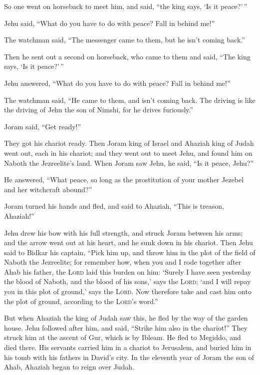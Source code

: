  So one went on horseback to meet him, and said, ``the
king says, `Is it peace?'\,''

Jehu said, ``What do you have to do with peace? Fall in behind me!''

The watchman said, ``The messenger came to them, but he isn't coming
back.''

 Then he sent out a second on horseback, who came to them
and said, ``The king says, `Is it peace?'\,''

Jehu answered, ``What do you have to do with peace? Fall in behind me!''

 The watchman said, ``He came to them, and isn't coming
back. The driving is like the driving of Jehu the son of Nimshi, for he
drives furiously.''

 Joram said, ``Get ready!''

They got his chariot ready. Then Joram king of Israel and Ahaziah king
of Judah went out, each in his chariot; and they went out to meet Jehu,
and found him on Naboth the Jezreelite's land.  When
Joram saw Jehu, he said, ``Is it peace, Jehu?''

He answered, ``What peace, so long as the prostitution of your mother
Jezebel and her witchcraft abound?''

 Joram turned his hands and fled, and said to Ahaziah,
``This is treason, Ahaziah!''

 Jehu drew his bow with his full strength, and struck
Joram between his arms; and the arrow went out at his heart, and he sunk
down in his chariot.  Then Jehu said to Bidkar his
captain, ``Pick him up, and throw him in the plot of the field of Naboth
the Jezreelite; for remember how, when you and I rode together after
Ahab his father, the \textsc{Lord} laid this burden on him:
 `Surely I have seen yesterday the blood of Naboth, and
the blood of his sons,' says the \textsc{Lord}; `and I will repay you in
this plot of ground,' says the \textsc{Lord}. Now therefore take and
cast him onto the plot of ground, according to the \textsc{Lord}'s
word.''

 But when Ahaziah the king of Judah saw this, he fled by
the way of the garden house. Jehu followed after him, and said, ``Strike
him also in the chariot!'' They struck him at the ascent of Gur, which
is by Ibleam. He fled to Megiddo, and died there.  His
servants carried him in a chariot to Jerusalem, and buried him in his
tomb with his fathers in David's city.  In the eleventh
year of Joram the son of Ahab, Ahaziah began to reign over Judah.

